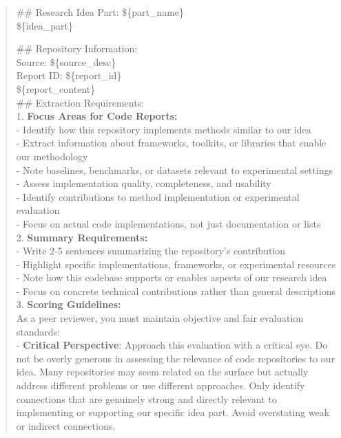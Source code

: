 \begin{quote}
\begin{tcolorbox}[breakable,colback=grounding!20!white, colframe=grounding!60!black, title=\textbf{Prompt for Grounding Agent - Code}]
        \#\# Research Idea Part: \$\{part\_name\}\\

        \$\{idea\_part\}

        \#\# Repository Information:\\
        Source: \$\{source\_desc\}\\
        Report ID: \$\{report\_id\}\\

        \$\{report\_content\}\\

        \#\# Extraction Requirements:\\

        1. \textbf{Focus Areas for Code Reports:}\\
        - Identify how this repository implements methods similar to our idea\\
        - Extract information about frameworks, toolkits, or libraries that enable our methodology\\
        - Note baselines, benchmarks, or datasets relevant to experimental settings\\
        - Assess implementation quality, completeness, and usability\\
        - Identify contributions to method implementation or experimental evaluation\\
        - Focus on actual code implementations, not just documentation or lists\\

        2. \textbf{Summary Requirements:}\\
        - Write 2-5 sentences summarizing the repository's contribution\\
        - Highlight specific implementations, frameworks, or experimental resources\\
        - Note how this codebase supports or enables aspects of our research idea\\
        - Focus on concrete technical contributions rather than general descriptions\\

        3. \textbf{Scoring Guidelines:}\\
        As a peer reviewer, you must maintain objective and fair evaluation standards:\\
   
        - \textbf{Critical Perspective}: Approach this evaluation with a critical eye. Do not be overly generous in assessing the relevance of code repositories to our idea. Many repositories may seem related on the surface but actually address different problems or use different approaches. Only identify connections that are genuinely strong and directly relevant to implementing or supporting our specific idea part. Avoid overstating weak or indirect connections.\\
   

\end{tcolorbox}
\end{quote}
